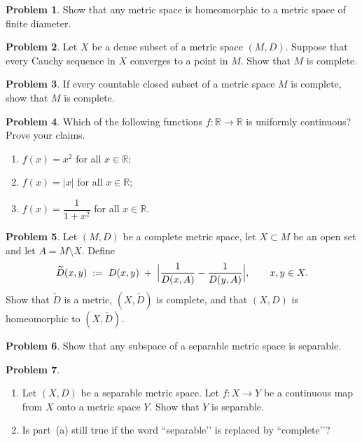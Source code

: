 \documentclass[10pt]{article}
\theoremstyle{definition} %
\newtheorem{problem}{Problem}
\theoremstyle{plain} %
\begin{document}
\begin{problem}
  Show that any metric space is homeomorphic to a metric space of finite diameter.
\end{problem}

\begin{problem}
  Let $X$ be a dense subset of a metric space $(M,D)$.  
  Suppose that every Cauchy sequence in $X$ converges to a point in $M$.  
  Show that $M$ is complete.
\end{problem}
\begin{problem}
  If every countable closed subset of a metric space $M$ is complete, show that $M$ is complete.
\end{problem}

\begin{problem}
  Which of the following functions $f : \mathbb{R} \to \mathbb{R}$ is uniformly continuous?  Prove your claims.
  \begin{enumerate}[label=(\alph*)]
      \item $f(x)=x^{2}$ for all $x\in\mathbb{R}$;
      \item $f(x)=\lvert x\rvert$ for all $x\in\mathbb{R}$;
      \item $f(x)=\dfrac{1}{1+x^{2}}$ for all $x\in\mathbb{R}$.
  \end{enumerate}
\end{problem}

\begin{problem}
  Let $(M,D)$ be a complete metric space, let $X\subset M$ be an open set and let $A = M\setminus X$.  Define
  \[
      \widetilde{D}(x,y)\;:=\;D(x,y)\;+\;\Bigl\lvert \frac{1}{D(x,A)} - \frac{1}{D(y,A)} \Bigr\rvert,
      \qquad x,y\in X.
  \]
  Show that $\widetilde{D}$ is a metric, $(X,\widetilde{D})$ is complete, and that $(X,D)$ is homeomorphic to $(X,\widetilde{D})$.
\end{problem}

\begin{problem}
  Show that any subspace of a separable metric space is separable.
\end{problem}
\begin{problem}
  \begin{enumerate}[label=(\alph*)]
      \item Let $(X,D)$ be a separable metric space.  Let $f : X \to Y$ be a continuous map from $X$ onto a metric space $Y$.  Show that $Y$ is separable.
      \item Is part~(a) still true if the word “separable’’ is replaced by “complete’’?
  \end{enumerate}
\end{problem}
\end{document}

